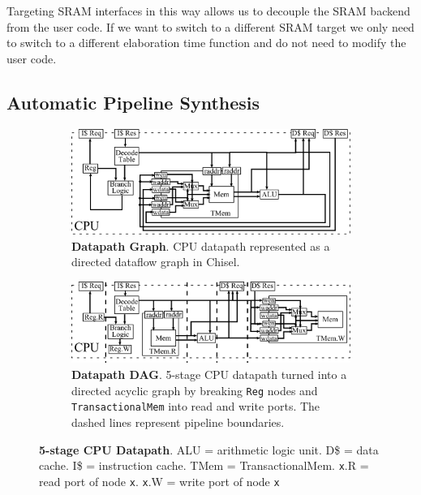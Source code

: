 Targeting SRAM interfaces in this way allows us to decouple the
SRAM backend from the user code. If we want to switch to a different
SRAM target we only need to switch to a different elaboration time
function and do not need to modify the user code.

\subsection{Automatic Pipeline Synthesis}
\begin{figure}[htb]
\centering
  \begin{subfigure}[t]{0.8\textwidth}
  \centering
  \includegraphics[width=\textwidth]{figures/pipeline.pdf}
  \caption{{\bf Datapath Graph}. CPU datapath represented as a
    directed dataflow graph in Chisel.}
  \label{fig:datapathgrah}
  \end{subfigure}
  \begin{subfigure}[t]{0.8\textwidth}
  \vspace{20pt}
  \centering
  \includegraphics[width=\textwidth]{figures/pipelinedag.pdf}
  \caption{{\bf Datapath DAG}. 5-stage CPU datapath turned into a
    directed acyclic graph by breaking {\tt Reg} nodes and {\tt
      TransactionalMem} into read and write ports. The dashed lines
    represent pipeline boundaries.}
  \label{fig:datapathdag}
  \end{subfigure}
\caption[5-stage CPU Datapath]{{\bf 5-stage CPU Datapath}. ALU = arithmetic logic unit. D\$
  = data cache. I\$ =  instruction cache. TMem =
  TransactionalMem. {\tt x}.R = read port of node {\tt x}. {\tt x}.W =
  write port of node {\tt x}}
\label{fig:datapath}
\end{figure}

